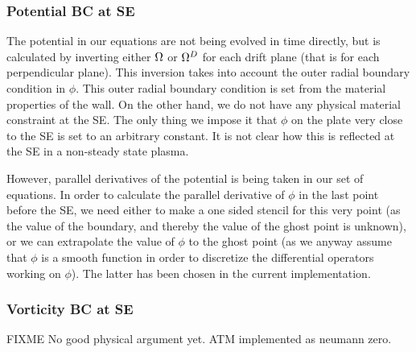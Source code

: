 \subsubsection{Potential BC at SE}
%
The potential in our equations are not being evolved in time directly, but is calculated by inverting either $\Omega$ or $\Omega^D$ for each drift plane (that is for each perpendicular plane).
This inversion takes into account the outer radial boundary condition in $\phi$.
This outer radial boundary condition is set from the material properties of the wall.
On the other hand, we do not have any physical material constraint at the SE.
The only thing we impose it that $\phi$ on the plate very close to the SE is set to an arbitrary constant.
 It is not clear how this is reflected at the SE in a non-steady state plasma.

However, parallel derivatives of the potential is being taken in our set of equations.
In order to calculate the parallel derivative of $\phi$ in the last point before the SE, we need either to make a one sided stencil for this very point (as the value of the boundary, and thereby the value of the ghost point is unknown), or we can extrapolate the value of $\phi$ to the ghost point (as we anyway assume that $\phi$ is a smooth function in order to discretize the differential operators working on $\phi$).
The latter has been chosen in the current implementation.

\subsubsection{Vorticity BC at SE}
%
%
FIXME
No good physical argument yet.
ATM implemented as neumann zero.

